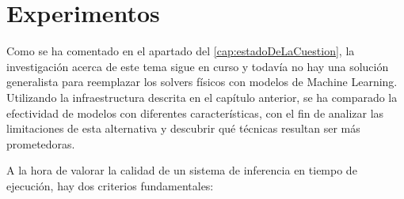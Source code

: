 \chapter{Experimentos}
\label{cap:experimentos}

Como se ha comentado en el apartado del \ref{cap:estadoDeLaCuestion}, la investigación acerca de este tema sigue en curso y todavía no hay una solución generalista para reemplazar los solvers físicos con modelos de Machine Learning. Utilizando la infraestructura descrita en el capítulo anterior, se ha comparado la efectividad de modelos con diferentes características, con el fin de analizar las limitaciones de esta alternativa y descubrir qué técnicas resultan ser más prometedoras. \newline

A la hora de valorar la calidad de un sistema de inferencia en tiempo de ejecución, hay dos criterios fundamentales:
